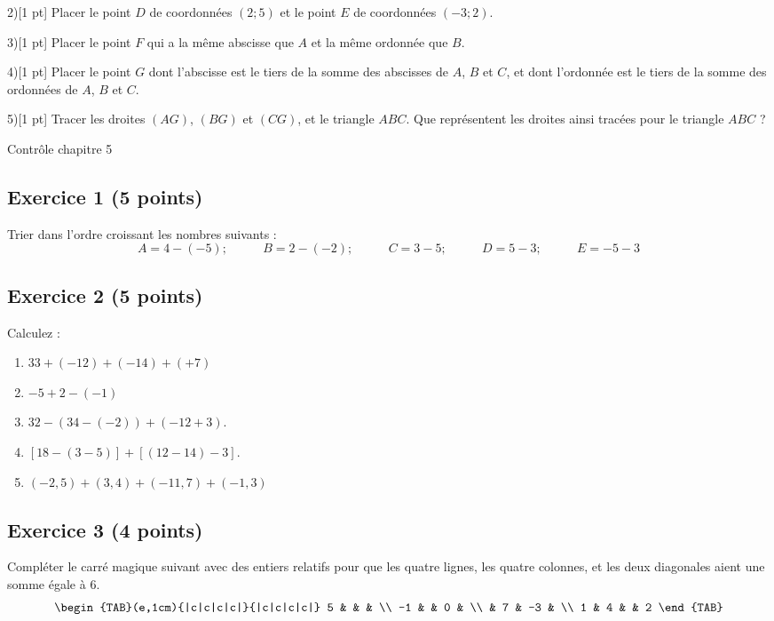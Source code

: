 \documentclass[14pt]{extreport}
\theoremstyle{plain}
\begin{document}
2)[1 pt] Placer le point $D$ de coordonnées $(2; 5)$ et le point $E$ de coordonnées $(-3; 2)$. 

3)[1 pt] Placer le point $F$ qui a la même abscisse que $A$ et la même 
ordonnée que $B$. 



4)[1 pt] Placer le point $G$ dont l'abscisse est le tiers de la somme des 
abscisses de $A$, $B$ et $C$, et dont l'ordonnée est le tiers de la 
somme des ordonnées de $A$, $B$ et $C$. 

5)[1 pt] Tracer les droites $(AG)$, $(BG)$ et $(CG)$, et le triangle $ABC$. Que représentent les droites ainsi tracées pour le triangle $ABC$ ?
\newpage 

\begin{center}{\Large Contrôle chapitre 5}\end{center}

 
 
\subsection*{Exercice 1 (5 points)}
 
 
 Trier dans l'ordre croissant les nombres suivants : 
 \[ A = 4 - (-5) ;\phantom{miaou}
  B = 2 - (-2) ;\phantom{miaou}
   C = 3 - 5 ; \phantom{miaou}
   D = 5 -3  ;\phantom{miaou}
   E = -5 - 3\]
\subsection*{Exercice 2 (5 points)}
 
 Calculez : \begin{enumerate}
 \item $33 + (-12) + (-14) + (+7) $
 \item $-5 + 2 - (-1)$
 \item $ 32 - (34 - (-2)) + (-12 + 3)$.
 \item $ [ 18 - (3 - 5)] + [(12-14) -3]$.
 \item $ (-2,5) + (3,4)  + (-11,7) + (-1,3)$ 
 \end{enumerate}

    
    \subsection*{Exercice 3 (4 points) }
    
Compléter le carré magique suivant avec des entiers relatifs pour que les quatre lignes, les quatre colonnes, 
et les deux diagonales aient une somme égale à $6$. 
\[
\begin{TAB}(e,1cm){|c|c|c|c|}{|c|c|c|c|}
    5 & & &  \\
    -1 &  & 0 &  \\
      & 7 & -3 & \\
    1  & 4 &  & 2
\end{TAB}
\]
\end{document}
